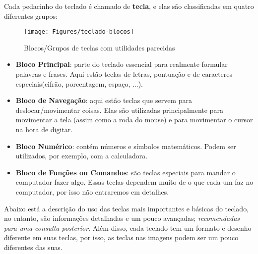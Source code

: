 \documentclass[hidelinks,12pt]{article}
\begin{document}
Cada pedacinho do teclado é chamado de \textbf{tecla}, e elas são classificadas em quatro diferentes grupos:

\begin{figure}[!h]
        \centering
		\texttt{[image: Figures/teclado-blocos]}
		\label{fig:teclado-blocos}
		\caption{Blocos/Grupos de teclas com utilidades parecidas}
\end{figure}



\begin{itemize}
	
		\item \textbf{Bloco Principal}: parte do teclado essencial para realmente formular palavras e frases. Aqui estão teclas de letras, pontuação e de caracteres especiais(cifrão, porcentagem, espaço, ...).
		
		\item \textbf{Bloco de Navegação}: aqui estão teclas que servem para deslocar/movimentar coisas. Elas são utilizadas principalmente para movimentar a tela (assim como a roda do mouse) e para movimentar o cursor na hora de digitar.
		
		\item \textbf{Bloco Numérico}: contém números e símbolos matemáticos. Podem ser utilizados, por exemplo, com a calculadora.
		
		\item \textbf{Bloco de Funções ou Comandos}: são teclas especiais para mandar o computador fazer algo. Essas teclas dependem muito de o que cada um faz no computador, por isso não entraremos em detalhes.
		
\end{itemize}	


Abaixo está a descrição do uso das teclas mais importantes e básicas do teclado, no entanto, são informações detalhadas e um pouco avançadas; \textit{recomendadas para uma consulta posterior}. Além disso, cada teclado tem um formato e desenho diferente em suas teclas, por isso, as teclas nas imagens podem ser um pouco diferentes das suas.
\end{document}
